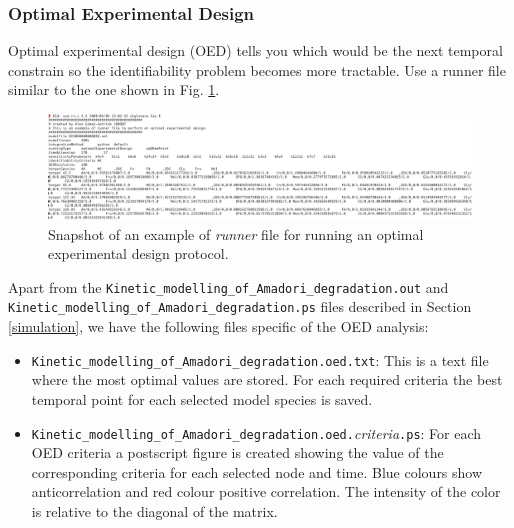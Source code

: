 \documentclass[a4paper, 11pt]{article}
\begin{document}
  \subsubsection{Optimal Experimental Design}
  Optimal experimental design (OED) tells you which would be the next temporal constrain so the identifiability problem becomes more tractable.
  Use a runner file similar to the one shown in Fig. \ref{oedRunner}.
  \begin{figure}[t]
    \begin{center}
      \includegraphics[scale=.5]{figures/oedRunner.eps}
      \caption{
        Snapshot of an example of \emph{runner} file for running an optimal experimental design protocol.
      }
      \label{oedRunner}
    \end{center}
  \end{figure}
  Apart from the \texttt{Kinetic\_modelling\_of\_Amadori\_degradation.out} and \\ \texttt{Kinetic\_modelling\_of\_Amadori\_degradation.ps} files described in Section \ref{simulation}, we have the following files specific of the OED analysis:
  \begin{itemize}
  \item \texttt{Kinetic\_modelling\_of\_Amadori\_degradation.oed.txt}:
    This is a text file where the most optimal values are stored.
    For each required criteria the best temporal point for each selected model species is saved.
  \item \texttt{Kinetic\_modelling\_of\_Amadori\_degradation.oed.}\textit{criteria}\texttt{.ps}:
    For each OED criteria a postscript figure is created showing the value of the corresponding criteria for each selected node and time.
    Blue colours show anticorrelation and red colour positive correlation.
    The intensity of the color is relative to the diagonal of the matrix.
  \end{itemize}
\end{document}
